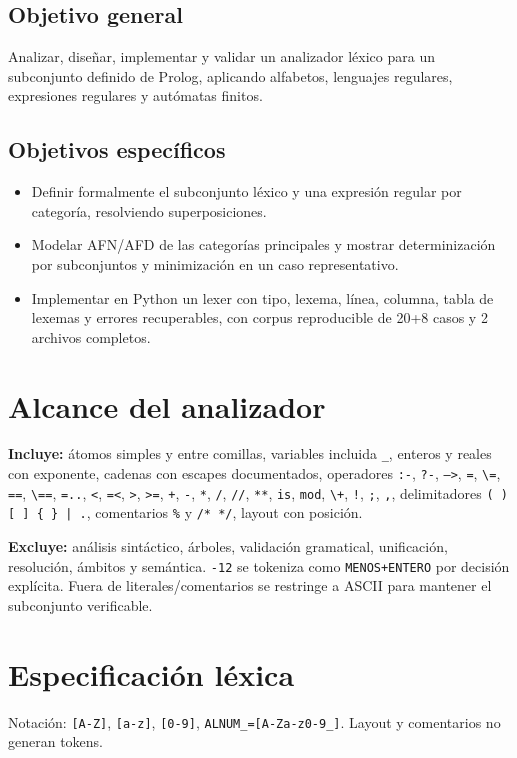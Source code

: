 \documentclass[12pt,a4paper]{article}
\begin{document}
\subsection{Objetivo general}
Analizar, diseñar, implementar y validar un analizador léxico para un subconjunto definido de Prolog, aplicando alfabetos, lenguajes regulares, expresiones regulares y autómatas finitos.

\subsection{Objetivos específicos}
\begin{itemize}
\item Definir formalmente el subconjunto léxico y una expresión regular por categoría, resolviendo superposiciones.
\item Modelar AFN/AFD de las categorías principales y mostrar determinización por subconjuntos y minimización en un caso representativo.
\item Implementar en Python un lexer con tipo, lexema, línea, columna, tabla de lexemas y errores recuperables, con corpus reproducible de 20+8 casos y 2 archivos completos.
\end{itemize}

\section{Alcance del analizador}
\textbf{Incluye:} átomos simples y entre comillas, variables incluida \texttt{\_}, enteros y reales con exponente, cadenas con escapes documentados, operadores \texttt{:-}, \texttt{?-}, \texttt{-->}, \texttt{=}, \texttt{\textbackslash=}, \texttt{==}, \texttt{\textbackslash==}, \texttt{=..}, \texttt{<}, \texttt{=<}, \texttt{>}, \texttt{>=}, \texttt{+}, \texttt{-}, \texttt{*}, \texttt{/}, \texttt{//}, \texttt{**}, \texttt{is}, \texttt{mod}, \texttt{\textbackslash+}, \texttt{!}, \texttt{;}, \texttt{,}, delimitadores \texttt{( ) [ ] \{ \} | .}, comentarios \texttt{\%} y \texttt{/* */}, layout con posición.

\textbf{Excluye:} análisis sintáctico, árboles, validación gramatical, unificación, resolución, ámbitos y semántica. \texttt{-12} se tokeniza como \texttt{MENOS+ENTERO} por decisión explícita. Fuera de literales/comentarios se restringe a ASCII para mantener el subconjunto verificable.

\section{Especificación léxica}
Notación: \texttt{[A-Z]}, \texttt{[a-z]}, \texttt{[0-9]}, \texttt{ALNUM\_=[A-Za-z0-9\_]}. Layout y comentarios no generan tokens.
\end{document}
